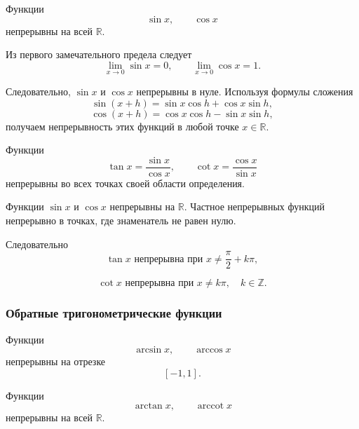 \begin{theorem}
Функции
\[
\sin x, \qquad \cos x
\]
непрерывны на всей $\mathbb{R}$.
\end{theorem}

\begin{Proof}
Из первого замечательного предела следует
\[
\lim_{x\to0}\sin x=0, \qquad
\lim_{x\to0}\cos x=1.
\]

Следовательно, $\sin x$ и $\cos x$ непрерывны в нуле.
Используя формулы сложения
\[
\sin(x+h)=\sin x\cos h+\cos x\sin h,
\]
\[
\cos(x+h)=\cos x\cos h-\sin x\sin h,
\]
получаем непрерывность этих функций в любой точке $x\in\mathbb{R}$.
\end{Proof}

\begin{theorem}
Функции
\[
\tan x=\frac{\sin x}{\cos x}, \qquad
\cot x=\frac{\cos x}{\sin x}
\]
непрерывны во всех точках своей области определения.
\end{theorem}

\begin{Proof}
Функции $\sin x$ и $\cos x$ непрерывны на $\mathbb{R}$.
Частное непрерывных функций непрерывно в точках,
где знаменатель не равен нулю.

Следовательно
\[
\tan x \text{ непрерывна при } x\neq \frac{\pi}{2}+k\pi,
\]

\[
\cot x \text{ непрерывна при } x\neq k\pi,
\quad k\in\mathbb{Z}.
\]
\end{Proof}

\subsubsection{Обратные тригонометрические функции}

\begin{theorem}
Функции
\[
\arcsin x, \qquad \arccos x
\]
непрерывны на отрезке
\[
[-1,1].
\]

Функции
\[
\arctan x, \qquad \operatorname{arccot} x
\]
непрерывны на всей $\mathbb{R}$.
\end{theorem}
